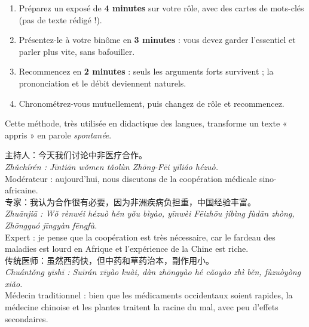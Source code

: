 \documentclass[11pt]{article}
\begin{document}
\begin{methode}
\begin{enumerate}
\item Préparez un exposé de \textbf{4 minutes} sur votre rôle, avec des cartes de mots-clés (pas de texte rédigé !).
\item Présentez-le à votre binôme en \textbf{3 minutes} : vous devez garder l'essentiel et parler plus vite, sans bafouiller.
\item Recommencez en \textbf{2 minutes} : seuls les arguments forts survivent ; la prononciation et le débit deviennent naturels.
\item Chronométrez-vous mutuellement, puis changez de rôle et recommencez.
\end{enumerate}
Cette méthode, très utilisée en didactique des langues, transforme un texte « appris » en parole \emph{spontanée}.
\end{methode}

\begin{exemplebox}
主持人：今天我们讨论中非医疗合作。\\
\emph{Zhǔchírén : Jīntiān wǒmen tǎolùn Zhōng-Fēi yīliáo hézuò.}\\
Modérateur : aujourd'hui, nous discutons de la coopération médicale sino-africaine.\\
专家：我认为合作很有必要，因为非洲疾病负担重，中国经验丰富。\\
\emph{Zhuānjiā : Wǒ rènwéi hézuò hěn yǒu bìyào, yīnwèi Fēizhōu jíbìng fùdān zhòng, Zhōngguó jīngyàn fēngfù.}\\
Expert : je pense que la coopération est très nécessaire, car le fardeau des maladies est lourd en Afrique et l'expérience de la Chine est riche.\\
传统医师：虽然西药快，但中药和草药治本，副作用小。\\
\emph{Chuántǒng yīshī : Suīrán xīyào kuài, dàn zhōngyào hé cǎoyào zhì běn, fùzuòyòng xiǎo.}\\
Médecin traditionnel : bien que les médicaments occidentaux soient rapides, la médecine chinoise et les plantes traitent la racine du mal, avec peu d'effets secondaires.
\end{exemplebox}
\end{document}
